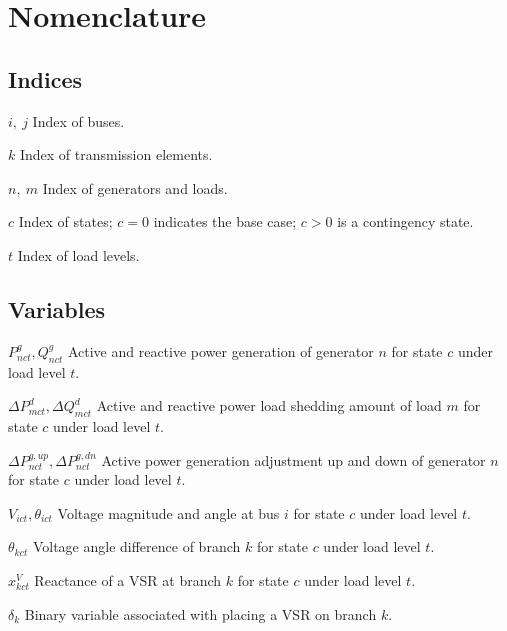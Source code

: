 \documentclass[journal]{IEEEtran}
\begin{document}
\section*{Nomenclature}
\subsection*{Indices}
\begin{IEEEdescription}
	\item[$i, \ j$] Index of buses.
	\item[$k$] Index of transmission elements.
	\item[$n,\ m$] Index of generators and loads.
	\item[$c$] Index of states; $c=0$ indicates the base case; $c>0$ is a contingency state.
	\item[$t$] Index of load levels.
\end{IEEEdescription} 


\subsection*{Variables}
\begin{IEEEdescription}
	\item[$P^g_{nct},Q^g_{nct}$] Active and reactive power generation of generator $n$ for state $c$ under load level $t$.
	\item[$\Delta P^d_{mct}, \Delta Q^d_{mct}$] Active and reactive power load shedding amount of load $m$ for state $c$ under load level $t$.
	\item[$\Delta P^{g,up}_{nct},\Delta P^{g,dn}_{nct}$] Active power generation adjustment up and down of generator $n$ for state $c$ under load level $t$.
	\item[$V_{ict},\theta_{ict}$] Voltage magnitude and angle at bus $i$ for state $c$ under load level $t$.
	\item[$\theta_{kct}$] Voltage angle difference of branch $k$ for state $c$ under load level $t$.
	\item[$x^V_{kct}$] Reactance of a VSR at branch $k$ for state $c$ under load level $t$.
	\item[$\delta_{k}$] Binary variable associated with placing a VSR on branch $k$.
\end{IEEEdescription} 
\end{document}
